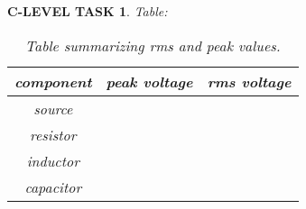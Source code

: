 \documentclass{book}
\numberwithin{equation}{section}
\newtheorem{clevel}{C-LEVEL TASK}
\theoremstyle{definition}
\begin{document}
\begin{clevel} Table:\par
\begin{table}[H]
\begin{center}
\begin{tabular}{|c|c|c|}\hline
component&peak voltage&rms voltage\\ \hline
source&&\\ \hline
resistor&&\\ \hline
inductor&&\\ \hline
capacitor&&\\ \hline
\end{tabular}
\caption{Table summarizing rms and peak values.}
\label{T:8R}
\end{center}
\end{table}
\end{clevel}
\end{document}
